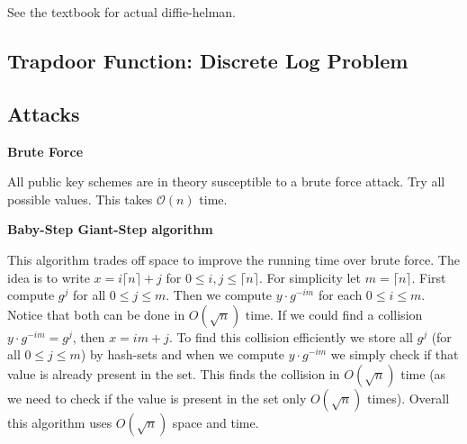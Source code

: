 \documentclass{article}
\begin{document}
    \vspace{2mm}
    See the textbook for actual diffie-helman.

\subsection*{Trapdoor Function: Discrete Log Problem}



\subsection*{Attacks}

\begin{center}
    \textbf{Brute Force}
\end{center}

All public key schemes are in theory susceptible to a brute force attack. Try all possible values. This takes $\mathcal{O}(n)$ time.

\begin{center}
    \textbf{Baby-Step Giant-Step algorithm}
\end{center}

This algorithm trades off space to improve the running time over brute force. The idea is to write $x = i\lceil n \rceil + j$ for $0 \le i,j \le \lceil n \rceil$. For simplicity let $m = \lceil n \rceil$. First compute $g^j$ for all $0 \le j \le m$. Then we compute $y\cdot g^{-im}$ for each $0 \le i \le m$. Notice that both can be done in $O(\sqrt n )$ time. If we could find a collision $y\cdot g^{-im} = g^j$, then $x = im + j$. To find this collision efficiently we store all $g^j$ (for all $0 \le j \le m$) by hash-sets and when we compute $y\cdot g^{-im}$ we simply check if that value is already present in the set. This finds the collision in $O(\sqrt{n})$ time (as we need to check if the value is present in the set only $O(\sqrt{n})$ times). Overall this algorithm uses $O(\sqrt{n})$ space and time.




\end{document}
